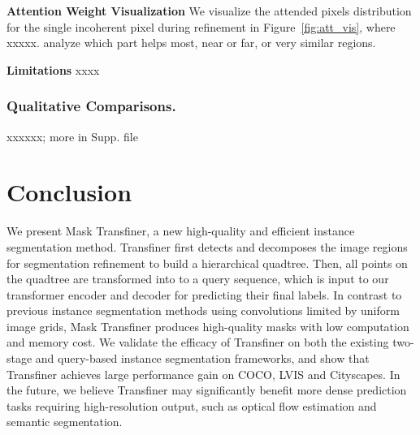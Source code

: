 \documentclass[10pt,twocolumn,letterpaper]{article}
\newcommand{\parsection}[1]{\vspace{1mm}\noindent\textbf{#1}}
\begin{document}
\parsection{Attention Weight Visualization} 
We visualize the attended pixels distribution for the single incoherent pixel during refinement in Figure~\ref{fig:att_vis}, where xxxxx. analyze which part helps most, near or far, or very similar regions.

\parsection{Limitations}
xxxx

\subsubsection{Qualitative Comparisons.}
xxxxxx; more in Supp. file




\section{Conclusion}
We present Mask Transfiner, a new high-quality and efficient instance segmentation method. Transfiner first detects and decomposes the image regions for segmentation refinement to build a hierarchical quadtree. Then, all points on the quadtree are transformed into to a query sequence, which is input to our transformer encoder and decoder for predicting their final labels. In contrast to previous instance segmentation methods using convolutions limited by uniform image grids, Mask Transfiner produces high-quality masks with low computation and memory cost. We validate the efficacy of Transfiner on both the existing two-stage and query-based instance segmentation frameworks, and show that Transfiner achieves large performance gain on COCO, LVIS and Cityscapes.
In the future, we believe Transfiner may significantly benefit more dense prediction tasks requiring high-resolution output, such as optical flow estimation and semantic segmentation.

{\small


}
\end{document}
